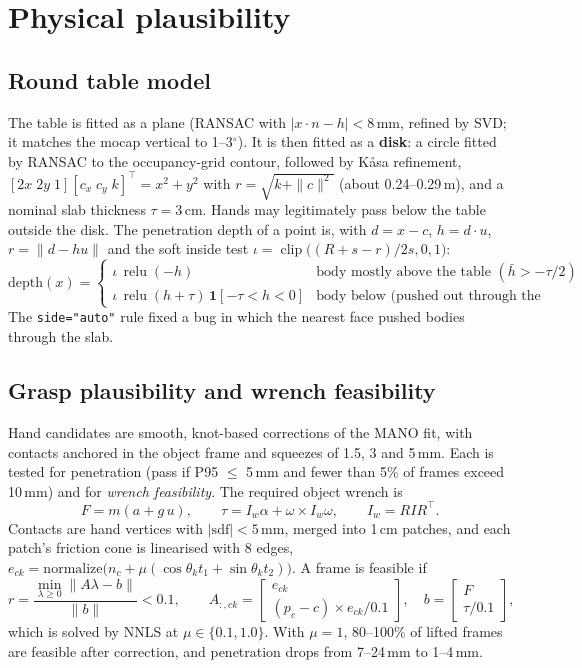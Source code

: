 \documentclass[10pt,a4paper]{article}
\newcommand{\relu}{\operatorname{relu}}
\newcommand{\clip}{\operatorname{clip}}
\begin{document}
\section{Physical plausibility}
\subsection{Round table model}
The table is fitted as a plane (RANSAC with $|x\cdot n-h|<8$\,mm, refined by SVD; it matches the mocap vertical to 1--3$^\circ$). It is then fitted as a
\textbf{disk}: a circle fitted by RANSAC to the occupancy-grid contour, followed by Kåsa refinement,
$[2x\;2y\;1][c_x\;c_y\;k]^\top=x^2+y^2$ with $r=\sqrt{k+\|c\|^2}$ (about 0.24--0.29\,m), and a nominal slab thickness $\tau=3$\,cm.
Hands may legitimately pass below the table outside the disk. The penetration depth of a point is, with $d=x-c$,
$h=d\cdot u$, $r=\|d-hu\|$ and the soft inside test $\iota=\clip\big((R+s-r)/2s,0,1\big)$:
\begin{equation}
\mathrm{depth}(x)=\begin{cases}\iota\,\relu(-h) & \text{body mostly above the table } (\bar h>-\tau/2)\\[2pt]
\iota\,\relu(h+\tau)\,\mathbf 1[-\tau<h<0] & \text{body below (pushed out through the underside)}\end{cases}
\end{equation}
The \texttt{side="auto"} rule fixed a bug in which the nearest face pushed bodies through the slab.

\subsection{Grasp plausibility and wrench feasibility}
Hand candidates are smooth, knot-based corrections of the MANO fit, with contacts anchored in the object frame and squeezes of 1.5, 3 and 5\,mm.
Each is tested for penetration (pass if P95 $\le$ 5\,mm and fewer than 5\% of frames exceed 10\,mm) and for \emph{wrench feasibility}. The required object wrench is
\begin{equation}
F=m(a+g\,u),\qquad \tau=I_w\alpha+\omega\times I_w\omega,\qquad I_w=RIR^\top .
\end{equation}
Contacts are hand vertices with $|\mathrm{sdf}|<5$\,mm, merged into 1\,cm patches, and each patch's friction cone is
linearised with 8 edges, $e_{ck}=\mathrm{normalize}\big(n_c+\mu(\cos\theta_k t_1+\sin\theta_k t_2)\big)$.
A frame is feasible if
\begin{equation}
r=\frac{\min_{\lambda\ge0}\|A\lambda-b\|}{\|b\|}<0.1,\qquad A_{:,ck}=\begin{bmatrix}e_{ck}\\ (p_c-c)\times e_{ck}/0.1\end{bmatrix},\quad b=\begin{bmatrix}F\\ \tau/0.1\end{bmatrix},
\end{equation}
which is solved by NNLS at $\mu\in\{0.1,1.0\}$. With $\mu=1$, 80--100\% of lifted frames are feasible after correction, and penetration drops from 7--24\,mm to 1--4\,mm.
\end{document}
